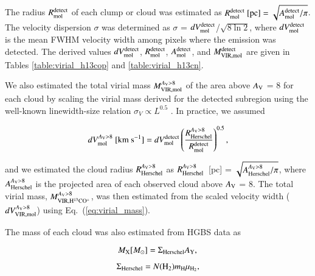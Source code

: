 \documentclass{aa}
\begin{document}
\noindent The radius $R_{\rm mol}^{\rm detect}$ of each clump or cloud was estimated as $R_{\rm mol}^{\rm detect} {\rm \ [pc]} = \sqrt{A_{\rm mol}^{\rm detect}/\pi}$. 
The velocity dispersion $\sigma$ was determined as $\sigma$ = $dV_{\rm mol}^{\rm detect}$/$\sqrt{8\ln{2}}$, 
where $dV_{\rm mol}^{\rm detect}$ is the mean FWHM velocity width among pixels where the emission was detected. 
The derived values $dV_{\rm mol}^{\rm detect}$, $R_{\rm mol}^{\rm detect}$, $A_{\rm mol}^{\rm detect}$, and $M_{\rm VIR,mol}^{\rm detect}$ are 
given in Tables \ref{table:virial_h13cop} and \ref{table:virial_h13cn}. 






We also estimated the total virial mass $M_{\rm VIR,mol}^{A_{\rm V}>8}$ of the area above $A_{\rm V}$ = 8 for each cloud by scaling the virial mass derived for the detected subregion using the well-known 
linewidth-size relation  $\sigma_V \propto L^{0.5}$ \citep{Larson81,Heyer09}. 
In practice, we assumed 


\begin{equation}
dV_{\rm mol}^{A_{\rm V}>8} \  [{\rm km\ s^{-1}}] = dV_{\rm mol}^{\rm detect} \left( \frac{R_{\rm Herschel}^{A_{\rm V}>8}}{R_{\rm mol}^{\rm detect}} \right)^{0.5},
\end{equation}


\noindent and we estimated the cloud radius $R_{\rm Herschel}^{A_{\rm V}>8}$  
as $R_{\rm Herschel}^{A_{\rm V}>8}${\rm \ [pc]} = $\sqrt{A_{\rm Herschel}^{A_{\rm V}>8}/\pi}$, 
where $A_{\rm Herschel}^{A_{\rm V}>8}$ is the projected area of each observed cloud above $A_{\rm V}$ = 8. 
The total virial mass, $M_{\rm VIR,H^{13}CO^+}^{A_{\rm V}>8}$, was then estimated from the scaled velocity width 
($dV_{\rm VIR,mol}^{A_{\rm V}>8}$) using Eq.~(\ref{eq:virial_mass}).


The mass of each cloud was also estimated from HGBS data as



\begin{equation}
M_{\rm X} [M_{\odot}] = \Sigma_{\rm Herschel} A_{\rm Y}, \\
\end{equation}


\begin{equation}
\Sigma_{\rm Herschel} = N({\rm H_2}) m_{\rm H} \mu_{\rm H_2},
\end{equation}
\end{document}
